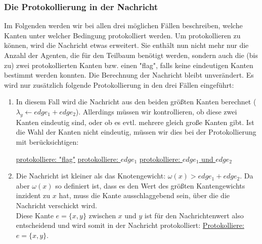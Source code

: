\subsubsection{Die Protokollierung in der Nachricht}

Im Folgenden werden wir bei allen drei möglichen Fällen beschreiben, welche Kanten unter welcher Bedingung protokolliert werden. Um protokollieren zu können, wird die Nachricht etwas erweitert. Sie enthält nun nicht mehr nur die Anzahl der Agenten, die für den Teilbaum benötigt werden, sondern auch die (bis zu) zwei protokollierten Kanten bzw. einen "flag", falls keine eindeutigen Kanten bestimmt werden konnten. Die Berechnung der Nachricht bleibt unverändert. Es wird nur zusätzlich folgende Protokollierung in den drei Fällen eingeführt: 

\begin{enumerate}[label=\alph*)]
	
	\item In diesem Fall wird die Nachricht aus den beiden größten Kanten berechnet ($\lambda_{y} \gets edge_{1} + edge_{2}$). Allerdings müssen wir kontrollieren, ob diese zwei Kanten eindeutig sind, oder ob es evtl. mehrere gleich große Kanten gibt. Ist die Wahl der Kanten nicht eindeutig, müssen wir dies bei der Protokollierung mit berücksichtigen:

		\begin{algorithmic}
			\State \uline{protokolliere: "flag"}
			\newline
			\State \uline{protokolliere: $edge_{1}$}
			\newline
			\Else
			\State \uline{protokolliere: $edge_{1}$ und $edge_{2}$}
			\newline
			\EndIf
		\end{algorithmic}
		
	
	\item Die Nachricht ist kleiner als das Knotengewicht: $\omega(x) > edge_{1}+edge_{2}$. Da aber $\omega(x)$ so definiert ist, dass es den Wert des größten Kantengewichts inzident zu $x$ hat, muss die Kante ausschlaggebend sein, über die die Nachricht verschickt wird. 
	\\
	Diese Kante $e = \{x, y\}$ zwischen $x$ und $y$ ist für den Nachrichtenwert also entscheidend und wird somit in der Nachricht protokolliert: \uline{Protokolliere: $e = \{x, y\}$}.
	

\end{enumerate}
